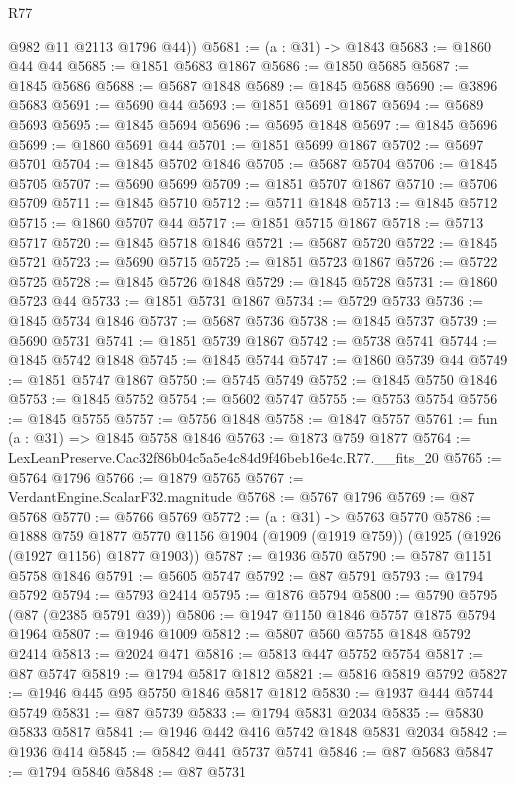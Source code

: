 \begin{lexlean}{R77}
\begin{coremodule}
        @982
        @11
        @2113
        @1796
        @44))
@5681 := (a : @31) -> @1843
@5683 := @1860 @44 @44
@5685 := @1851 @5683 @1867
@5686 := @1850 @5685
@5687 := @1845 @5686
@5688 := @5687 @1848
@5689 := @1845 @5688
@5690 := @3896 @5683
@5691 := @5690 @44
@5693 := @1851 @5691 @1867
@5694 := @5689 @5693
@5695 := @1845 @5694
@5696 := @5695 @1848
@5697 := @1845 @5696
@5699 := @1860 @5691 @44
@5701 := @1851 @5699 @1867
@5702 := @5697 @5701
@5704 := @1845 @5702 @1846
@5705 := @5687 @5704
@5706 := @1845 @5705
@5707 := @5690 @5699
@5709 := @1851 @5707 @1867
@5710 := @5706 @5709
@5711 := @1845 @5710
@5712 := @5711 @1848
@5713 := @1845 @5712
@5715 := @1860 @5707 @44
@5717 := @1851 @5715 @1867
@5718 := @5713 @5717
@5720 := @1845 @5718 @1846
@5721 := @5687 @5720
@5722 := @1845 @5721
@5723 := @5690 @5715
@5725 := @1851 @5723 @1867
@5726 := @5722 @5725
@5728 := @1845 @5726 @1848
@5729 := @1845 @5728
@5731 := @1860 @5723 @44
@5733 := @1851 @5731 @1867
@5734 := @5729 @5733
@5736 := @1845 @5734 @1846
@5737 := @5687 @5736
@5738 := @1845 @5737
@5739 := @5690 @5731
@5741 := @1851 @5739 @1867
@5742 := @5738 @5741
@5744 := @1845 @5742 @1848
@5745 := @1845 @5744
@5747 := @1860 @5739 @44
@5749 := @1851 @5747 @1867
@5750 := @5745 @5749
@5752 := @1845 @5750 @1846
@5753 := @1845 @5752
@5754 := @5602 @5747
@5755 := @5753 @5754
@5756 := @1845 @5755
@5757 := @5756 @1848
@5758 := @1847 @5757
@5761 := fun (a : @31) => @1845 @5758 @1846
@5763 := @1873 @759 @1877
@5764 := LexLeanPreserve.Cac32f86b04c5a5e4c84d9f46beb16e4c.R77.__fits_20
@5765 := @5764 @1796
@5766 := @1879 @5765
@5767 := VerdantEngine.ScalarF32.magnitude
@5768 := @5767 @1796
@5769 := @87 @5768
@5770 := @5766 @5769
@5772 := (a : @31) -> @5763 @5770
@5786 := @1888
    @759
    @1877
    @5770
    @1156
    @1904
    (@1909 (@1919 @759))
    (@1925 (@1926 (@1927 @1156) @1877 @1903))
@5787 := @1936 @570
@5790 := @5787 @1151 @5758 @1846
@5791 := @5605 @5747
@5792 := @87 @5791
@5793 := @1794 @5792
@5794 := @5793 @2414
@5795 := @1876 @5794
@5800 := @5790 @5795 (@87 (@2385 @5791 @39))
@5806 := @1947 @1150 @1846 @5757 @1875 @5794 @1964
@5807 := @1946 @1009
@5812 := @5807 @560 @5755 @1848 @5792 @2414
@5813 := @2024 @471
@5816 := @5813 @447 @5752 @5754
@5817 := @87 @5747
@5819 := @1794 @5817 @1812
@5821 := @5816 @5819 @5792
@5827 := @1946 @445 @95 @5750 @1846 @5817 @1812
@5830 := @1937 @444 @5744 @5749
@5831 := @87 @5739
@5833 := @1794 @5831 @2034
@5835 := @5830 @5833 @5817
@5841 := @1946 @442 @416 @5742 @1848 @5831 @2034
@5842 := @1936 @414
@5845 := @5842 @441 @5737 @5741
@5846 := @87 @5683
@5847 := @1794 @5846
@5848 := @87 @5731

\end{coremodule}
\end{lexlean}
